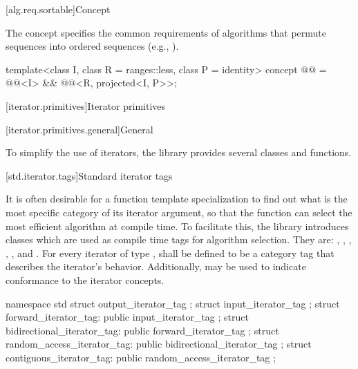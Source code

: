 [alg.req.sortable]{Concept }

\pnum
The  concept specifies the common requirements of
algorithms that permute sequences into ordered sequences (e.g., ).

\begin{codeblock}
template<class I, class R = ranges::less, class P = identity>
  concept @@ =
    @@<I> &&
    @@<R, projected<I, P>>;
\end{codeblock}

[iterator.primitives]{Iterator primitives}

[iterator.primitives.general]{General}

\pnum
To simplify the use of iterators, the library provides
several classes and functions.

[std.iterator.tags]{Standard iterator tags}

\pnum
{}%
%
%
%
%
%
It is often desirable for a
function template specialization
to find out what is the most specific category of its iterator
argument, so that the function can select the most efficient algorithm at compile time.
To facilitate this, the
library introduces
classes which are used as compile time tags for algorithm selection.
They are:
,
,
,
,
,
and
.
For every iterator of type
,
shall be defined to be a category tag that describes the
iterator's behavior.
Additionally,
may be used to indicate conformance to
the iterator concepts.

\begin{codeblock}
namespace std {
  struct output_iterator_tag { };
  struct input_iterator_tag { };
  struct forward_iterator_tag: public input_iterator_tag { };
  struct bidirectional_iterator_tag: public forward_iterator_tag { };
  struct random_access_iterator_tag: public bidirectional_iterator_tag { };
  struct contiguous_iterator_tag: public random_access_iterator_tag { };
}
\end{codeblock}

